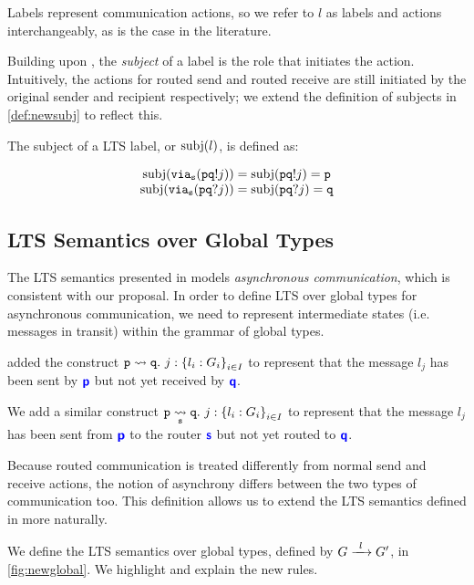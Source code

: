 Labels represent communication actions, so we refer
to $l$ as labels and actions interchangeably,
as is the case in the literature.

Building upon \cite{characterisation},
the \textit{subject} of a label is the role
that initiates the action. 
Intuitively, the actions for routed send and routed
receive are still initiated by the original sender and
recipient respectively;
we extend the definition
of subjects in \cref{def:newsubj} to reflect this.

\begin{definition}[Subject]
The subject of a LTS label, or $\subj{l}$, is defined as:

\doublespacing
\[
\begin{array}{c}
\subj{\via{s}{\aout{p}{q}{j}}} = 
	\subj{\aout{p}{q}{j}} = \mrole{p} \\
\subj{\via{s}{\ain{p}{q}{j}}} = 
	\subj{\ain{p}{q}{j}} = \mrole{q} \\
\end{array}
\]
\singlespacing
\label{def:newsubj}
\end{definition}

\subsection{LTS Semantics over Global Types}
\label{subsection:newltsglobal}

The LTS semantics presented in \cite{characterisation}
models \textit{asynchronous communication},
which is consistent with our proposal.
In order to define LTS over global types for
asynchronous communication, we need to
represent intermediate states (i.e. messages in transit)
within the grammar of global types.

\cite{characterisation} added the construct
{$\gtrans{p}{q}{j}{l_i: G_i}{i \in I}$}
to represent that the message $l_j$ has been
sent by $\role{p}$ but not yet received by $\role{q}$.

We add a similar construct
{$\gtransroute{p}{q}{s}{j}{l_i: G_i}{i \in I}$}
to represent that the message $l_j$ has
been sent from $\role{p}$ to the router $\role{s}$
but not yet routed to $\role{q}$.

Because routed communication is treated differently
from normal send and receive actions, the notion
of asynchrony differs between the two types of communication
too. This definition allows us to extend
the LTS semantics defined in \cite{characterisation}
more naturally.

We define the LTS semantics 
over global types,
defined by $\treduce{G}{G'}{l}$,
in \cref{fig:newglobal}.
We highlight and explain the new rules.

